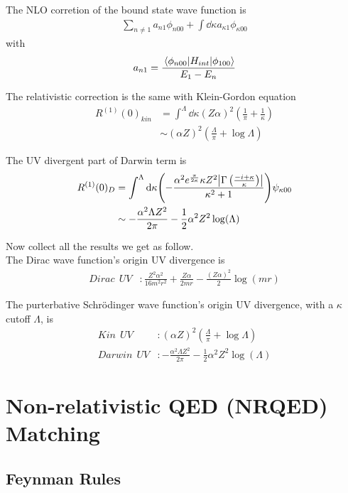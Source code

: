 \documentclass{article}
\renewcommand{\a}{\alpha}
\newcommand{\ka}{\kappa}
\begin{document}
The NLO corretion of the bound state wave function is
\begin{align}
	\sum_{n\neq 1}a_{n1}\phi_{n00}+\int \dd\ka a_{\ka1}\phi_{\ka00}
\end{align}
with
\begin{align}
	a_{n1}=\frac{\mel{\phi_{n00}}{H_{int}}{\phi_{100}}}{E_1-E_n}
\end{align}

The relativistic correction is the same with Klein-Gordon equation
\begin{align}
	R^{(1)}(0)_{kin} & =\int^\Lambda\dd\ka(Z\alpha)^2(\frac{1}{\pi}+\frac{1}{\ka}) \\
	                 & \sim(\alpha Z)^2(\frac{\Lambda}{\pi }+\log{\Lambda})
\end{align}

The UV divergent part of Darwin term is
\begin{align}
	R^{(1)}(0)_D & =\int^{\Lambda}\dd \ka\pqty{-\frac{\alpha ^2 e^{\frac{\pi }{2 \kappa }} \kappa  Z^2 \abs{ \Gamma \left(\frac{-i+\kappa }{\kappa }\right)} }{\kappa ^2+1}}\psi_{\ka00}
	\\&\sim-\frac{\alpha ^2 \Lambda  Z^2}{2 \pi }-\frac{1}{2} \alpha ^2 Z^2 \log (\Lambda )
\end{align}

Now collect all the results we get as follow.\\
The Dirac wave function's origin UV divergence is
\begin{align}
	Dirac\ \ UV & :\frac{Z^2\a^2}{16m^2r^2}+\frac{Z\a}{2mr}-\frac{(Z\alpha)^2}{2}\log(m r)
\end{align}

The purterbative Schr\"odinger wave function's origin UV divergence, with a $\ka$ cutoff $\Lambda$, is
\begin{align}
	Kin\ \  UV    & :(\alpha Z)^2(\frac{\Lambda}{\pi }+\log{\Lambda})                                 \\
	Darwin\ \  UV & :-\frac{\alpha ^2 \Lambda  Z^2}{2 \pi }-\frac{1}{2} \alpha ^2 Z^2 \log (\Lambda )
\end{align}

\section{Non-relativistic QED (NRQED) Matching}
\subsection{Feynman Rules}
\end{document}
